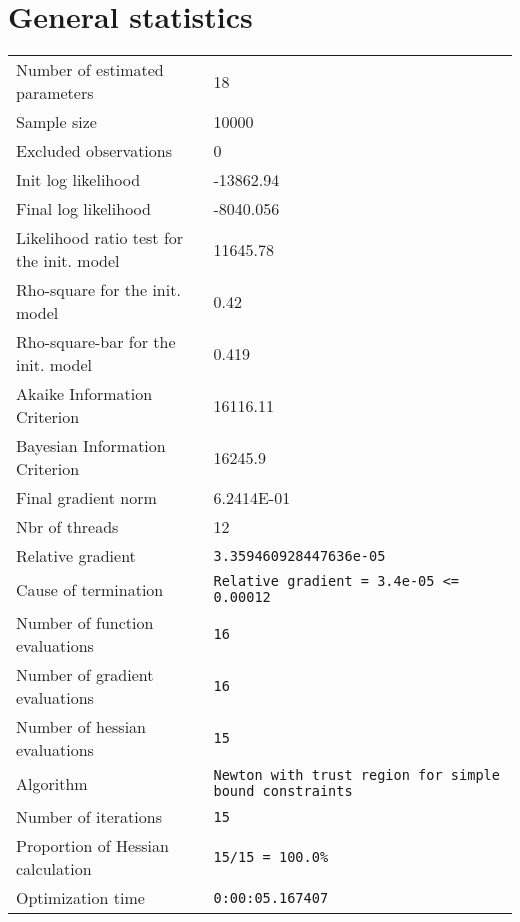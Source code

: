 



\section{General statistics}
\begin{tabular}{ll}
Number of estimated parameters & 18 \\
Sample size & 10000 \\
Excluded observations & 0 \\
Init log likelihood & -13862.94 \\
Final log likelihood & -8040.056 \\
Likelihood ratio test for the init. model & 11645.78 \\
Rho-square for the init. model & 0.42 \\
Rho-square-bar for the init. model & 0.419 \\
Akaike Information Criterion & 16116.11 \\
Bayesian Information Criterion & 16245.9 \\
Final gradient norm & 6.2414E-01 \\
Nbr of threads & 12 \\
Relative gradient & \verb$3.359460928447636e-05$ \\
Cause of termination & \verb$Relative gradient = 3.4e-05 <= 0.00012$ \\
Number of function evaluations & \verb$16$ \\
Number of gradient evaluations & \verb$16$ \\
Number of hessian evaluations & \verb$15$ \\
Algorithm & \verb$Newton with trust region for simple bound constraints$ \\
Number of iterations & \verb$15$ \\
Proportion of Hessian calculation & \verb$15/15 = 100.0%$ \\
Optimization time & \verb$0:00:05.167407$ \\
\end{tabular}

